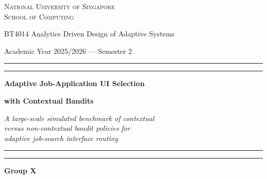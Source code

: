 \documentclass[11pt,a4paper]{article}
\begin{document}
\begin{titlepage}
\centering
\vspace*{1.4cm}

{\large\scshape National University of Singapore \\[0.2em] School of Computing \par}
\vspace{0.5cm}
{\large BT4014 Analytics Driven Design of Adaptive Systems \par}
{\normalsize Academic Year 2025/2026 --- Semester 2 \par}

\vspace{1.2cm}
{\color{accent}\rule{0.85\textwidth}{1.2pt}}
\vspace{0.3cm}

\noindent
\begin{minipage}{0.04\textwidth}
    \centering\color{accent}\rule[-3.7cm]{1.2pt}{4.2cm}
\end{minipage}\hfill
\begin{minipage}{0.88\textwidth}
    \centering
    \vspace{0.2cm}
    {\Huge\bfseries Adaptive Job-Application UI Selection \par}
    \vspace{0.35em}
    {\Huge\bfseries with Contextual Bandits \par}
    \vspace{0.8cm}
    {\large\itshape A large-scale simulated benchmark of contextual \\[0.1em]
    versus non-contextual bandit policies for \\[0.1em]
    adaptive job-search interface routing \par}
\end{minipage}\hfill
\begin{minipage}{0.04\textwidth}
    \centering\color{accent}\rule[-3.7cm]{1.2pt}{4.2cm}
\end{minipage}

\vspace{0.3cm}
{\color{accent}\rule{0.85\textwidth}{1.2pt}}

\vfill

{\Large\bfseries Group X \par}
\vspace{0.6cm}


\end{titlepage}
\end{document}
